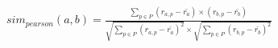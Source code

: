\documentclass{article}
\begin{document}
$sim_{pearson}(a,b) = \frac{\sum_{p \in P}{(r_{a,p} - \bar{r_a}) \times (r_{b,p} - \bar{r_b})}}{\sqrt{\sum_{p \in P}{(r_{a,p} - \bar{r_a})^2}} \times \sqrt{\sum_{p \in P}{(r_{b,p} - \bar{r_b})^2}}}$
\end{document}
